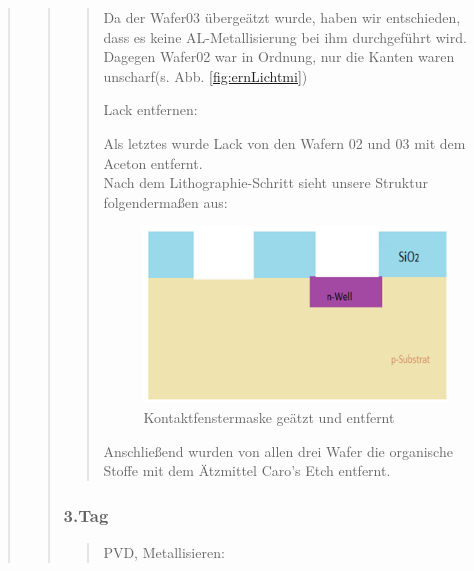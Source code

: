 \begin{quote}
\begin{quote}
\begin{quote}
    		\vspace{2em}
    		
    		
    		Da der Wafer03 übergeätzt wurde, haben wir entschieden, dass es 
    		keine AL-Metallisierung bei ihm durchgeführt wird.\\
			Dagegen Wafer02 war in Ordnung, nur die Kanten waren unscharf(s. 
			Abb. \ref{fig:ernLichtmi})

			Lack entfernen:

			Als letztes wurde Lack von den Wafern 02 und 03 mit dem Aceton 
			entfernt.\\
			Nach dem Lithographie-Schritt sieht unsere Struktur folgendermaßen 
			aus:
    		
    		\vspace{2em}

    		\begin{figure}[H]
				\hspace{3 cm}
                  \includegraphics[scale=1, trim = 0cm 0cm 0cm 0cm,clip]
                	{./HerstellungBilder/KontaktfenstergeaetztundLackentfernt.png}
                  \caption{Kontaktfenstermaske geätzt und entfernt}
                \label{fig:Konfengeaetzt}
            \end{figure}
            
    		\vspace{2em}
    		
			Anschließend wurden von allen drei Wafer die organische Stoffe mit 
			dem Ätzmittel Caro's Etch entfernt.
			
		\end{quote}
		
		\subsubsection{3.Tag}
		\begin{quote}
			
		PVD, Metallisieren:\\


\end{quote}
\end{quote}
\end{quote}
